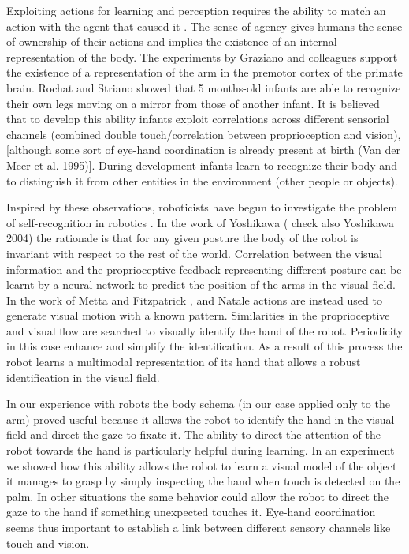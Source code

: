 Exploiting actions for learning and perception requires the ability to match an action with the agent that caused it \cite{jeannerod02mechanism}. The sense of agency gives humans the sense of ownership of their actions and implies the existence of an internal representation of the body. The experiments by Graziano and colleagues \cite{graziano00coding} support the existence of a representation of the arm in the premotor cortex of the primate brain. Rochat and Striano \cite{rochat00perceived} showed that 5 months-old infants are able to recognize their own legs moving on a mirror from those of another infant. It is believed that to develop this ability infants exploit correlations across different sensorial channels (combined double touch/correlation between proprioception and vision), [although some sort of eye-hand coordination is already present at birth (Van der Meer et al. 1995)]. During development infants learn to recognize their body and to distinguish it from other entities in the environment (other people or objects). 

Inspired by these observations, roboticists have begun to investigate the problem of self-recognition in robotics \cite{yoshikawa03doestheinvariance,metta03early,natale05exploring,gold05learning}. In the work of Yoshikawa (\cite{yoshikawa03doestheinvariance} check also Yoshikawa 2004) the rationale is that for any given posture the body of the robot is invariant with respect to the rest of the world. Correlation between the visual information and the proprioceptive feedback representing different posture can be learnt by a neural network to predict the position of the arms in the visual field. In the work of Metta and Fitzpatrick \cite{metta03early}, and Natale \cite{natale05exploring} actions are instead used to generate visual motion with a known pattern. Similarities in the proprioceptive and visual flow are searched to visually identify the hand of the robot. Periodicity in this case enhance and simplify the identification. As a result of this process the robot learns a multimodal representation of its hand that allows a robust identification in the visual field.

In our experience with robots the body schema (in our case applied only to the arm) proved useful because it allows the robot to identify the hand in the visual field and direct the gaze to fixate it. The ability to direct the attention of the robot towards the hand is particularly helpful during learning. In an experiment we showed how this ability allows the robot to learn a visual model of the object it manages to grasp by simply inspecting the hand when touch is detected on the palm. In other situations the same behavior could allow the robot to direct the gaze to the hand if something unexpected touches it. Eye-hand coordination seems thus important to establish a link between different sensory channels like touch and vision.

